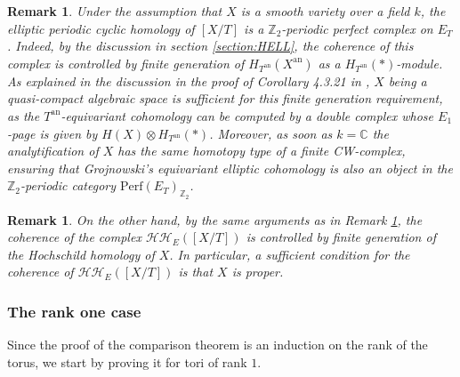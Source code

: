 \documentclass[11pt,letterpaper]{amsart}
\newtheorem{remark}[dummy]{Remark}
\newcommand{\bC}{\mathbb{C}}
\newcommand{\bZ}{\mathbb{Z}}
\newcommand{\cHH}{\mathcal{HH}}
\newcommand{\an}{\mathrm{an}}
\newcommand{\Perf}{\mathrm{Perf}}
\begin{document}
\begin{remark}\label{remark:coherence}
Under the assumption that $X$ is a smooth variety over a field $k$, the elliptic periodic cyclic homology of $[X/T]$ is a $\bZ_2$-periodic perfect complex on $E_T$. Indeed, by the discussion in section \ref{section:HELL}, the coherence of this complex is controlled by finite generation of $H_{T^\an}(X^\an)$ as a $H_{T^\an}(\ast)$-module.
As explained in the discussion in the proof of Corollary 4.3.21 in \cite{HChen}, $X$ being a quasi-compact algebraic space is sufficient for this finite generation requirement, as the $T^\an$-equivariant cohomology can be computed by a double complex whose $E_1$-page is given by $H(X)\otimes H_{T^\an}(\ast)$.
Moreover, as soon as $k=\bC$ the analytification of $X$ has the same homotopy type of a finite CW-complex, ensuring that Grojnowski's equivariant elliptic cohomology is also an object in the $\bZ_2$-periodic category $\Perf(E_T)_{\bZ_2}$. 
\end{remark}
\begin{remark}
On the other hand, by the same arguments as in Remark \ref{remark:coherence}, the coherence of the complex $\cHH_E([X/T])$ is controlled by finite generation of the Hochschild homology of $X$. In particular, a sufficient condition for the coherence of $\cHH_E([X/T])$ is that $X$ is proper. 
\end{remark}

\subsubsection{The rank one case}
Since the proof of the comparison theorem is an induction on the rank of the torus, we start by proving it for tori of rank $1$. 
\end{document}
